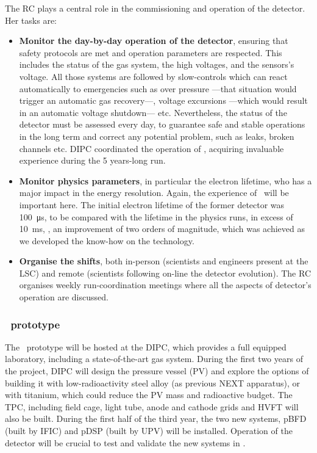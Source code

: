 The RC plays a central role in the commissioning and operation of the detector. Her tasks are:

\indent

\begin{itemize}[noitemsep,topsep=0pt,parsep=0pt,partopsep=0pt]
\item {\bf Monitor the day-by-day operation of the detector}, ensuring that safety protocols are met and operation parameters are respected. This includes the status of the gas system, the high voltages, and the sensors's voltage. All those systems are followed by slow-controls which can react automatically to emergencies such as over pressure ---that situation would trigger an automatic gas recovery---, voltage excursions ---which would result in an automatic voltage shutdown--- etc. Nevertheless, the status of the detector must be assessed every day, to guarantee safe and stable operations in the long term and correct any potential problem, such as leaks, broken channels etc. DIPC coordinated the operation of \NEW, acquiring invaluable experience during the 5 years-long run. 
 
\item {\bf Monitor physics parameters},  in particular the electron lifetime, who has a major impact in the energy resolution. Again, the experience of \NEW\ will be important here. The initial electron lifetime of the former detector was \SI{100}{\micro\second}, to be compared with the lifetime in the physics runs, in excess of 
\SI{10}{\milli\second}, \eg, an improvement of two orders of magnitude, which was achieved as we developed the know-how on the technology. 

\item {\bf Organise the shifts}, both in-person (scientists and engineers present at the LSC) and remote (scientists following on-line the detector evolution). The RC organises weekly run-coordination meetings where all the aspects of detector's operation are discussed. 
\end{itemize}

\indent

\subsubsection*{\HDEMO\ prototype}

\indent

The \HDEMO\ prototype will be hosted at the DIPC, which provides a full equipped laboratory, including a state-of-the-art gas system.  During the first two years of the project, DIPC will design the pressure vessel (PV) and explore the options of building it with low-radioactivity steel alloy (as previous NEXT apparatus), or with titanium, which could reduce the PV mass and radioactive budget. The TPC, including field cage, light tube, anode and cathode grids and HVFT will also be built.  During the first half of the third year, the two new systems, pBFD (built by IFIC) and pDSP (built by UPV) will be installed. Operation of the detector will be crucial to test and validate the new systems in \NHD. 

